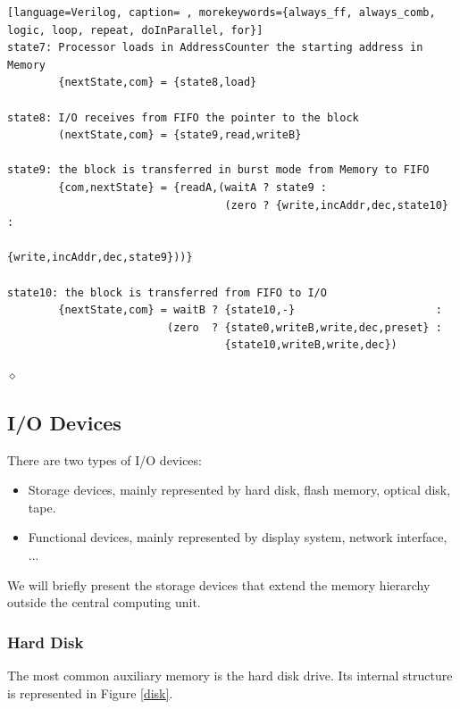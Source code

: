 \begin{exemplu}
{{\begin{shaded*}
\begin{lstlisting}[language=Verilog, caption= , morekeywords={always_ff, always_comb, logic, loop, repeat, doInParallel, for}]
state7: Processor loads in AddressCounter the starting address in Memory
        {nextState,com} = {state8,load}

state8: I/O receives from FIFO the pointer to the block
        (nextState,com} = {state9,read,writeB}

state9: the block is transferred in burst mode from Memory to FIFO
        {com,nextState} = {readA,(waitA ? state9 :
                                  (zero ? {write,incAddr,dec,state10} :
                                          {write,incAddr,dec,state9}))}

state10: the block is transferred from FIFO to I/O
        {nextState,com} = waitB ? {state10,-}                      :
                         (zero  ? {state0,writeB,write,dec,preset} :
                                  {state10,writeB,write,dec})
\end{lstlisting}
\end{shaded*}
}}

$\diamond$
\end{exemplu}



\subsection{I/O Devices}

There are two types of I/O devices:
\begin{itemize}
    \item Storage devices, mainly represented by hard disk, flash memory, optical disk, tape.
    \item Functional devices, mainly represented by display system, network interface, ...
\end{itemize}
We will briefly present the storage devices that extend the memory hierarchy outside the central computing unit.

\subsubsection{Hard Disk}

The most common auxiliary memory is the hard disk drive. Its internal structure is represented in Figure \ref{disk}.


